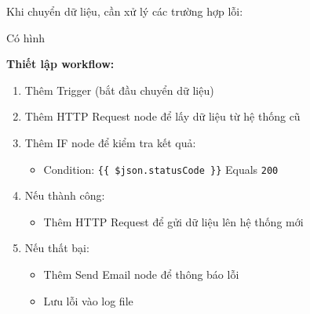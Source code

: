 Khi chuyển dữ liệu, cần xử lý các trường hợp lỗi:

Có hình

\textbf{Thiết lập workflow:}
\begin{enumerate}
    \item Thêm Trigger (bắt đầu chuyển dữ liệu)
    \item Thêm HTTP Request node để lấy dữ liệu từ hệ thống cũ
    \item Thêm IF node để kiểm tra kết quả:
    \begin{itemize}
        \item Condition: \verb|{{ $json.statusCode }}| Equals \verb|200|
    \end{itemize}
    \item Nếu thành công:
    \begin{itemize}
        \item Thêm HTTP Request để gửi dữ liệu lên hệ thống mới
    \end{itemize}
    \item Nếu thất bại:
    \begin{itemize}
        \item Thêm Send Email node để thông báo lỗi
        \item Lưu lỗi vào log file
    \end{itemize}
\end{enumerate}